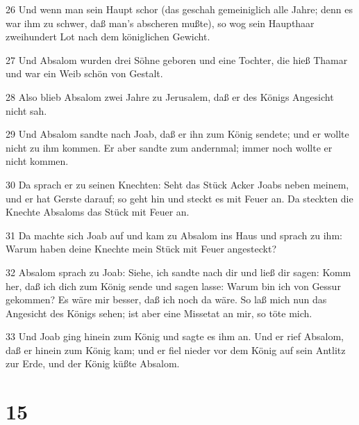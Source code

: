 \par 26 Und wenn man sein Haupt schor (das geschah gemeiniglich alle Jahre; denn es war ihm zu schwer, daß man's abscheren mußte), so wog sein Haupthaar zweihundert Lot nach dem königlichen Gewicht.
\par 27 Und Absalom wurden drei Söhne geboren und eine Tochter, die hieß Thamar und war ein Weib schön von Gestalt.
\par 28 Also blieb Absalom zwei Jahre zu Jerusalem, daß er des Königs Angesicht nicht sah.
\par 29 Und Absalom sandte nach Joab, daß er ihn zum König sendete; und er wollte nicht zu ihm kommen. Er aber sandte zum andernmal; immer noch wollte er nicht kommen.
\par 30 Da sprach er zu seinen Knechten: Seht das Stück Acker Joabs neben meinem, und er hat Gerste darauf; so geht hin und steckt es mit Feuer an. Da steckten die Knechte Absaloms das Stück mit Feuer an.
\par 31 Da machte sich Joab auf und kam zu Absalom ins Haus und sprach zu ihm: Warum haben deine Knechte mein Stück mit Feuer angesteckt?
\par 32 Absalom sprach zu Joab: Siehe, ich sandte nach dir und ließ dir sagen: Komm her, daß ich dich zum König sende und sagen lasse: Warum bin ich von Gessur gekommen? Es wäre mir besser, daß ich noch da wäre. So laß mich nun das Angesicht des Königs sehen; ist aber eine Missetat an mir, so töte mich.
\par 33 Und Joab ging hinein zum König und sagte es ihm an. Und er rief Absalom, daß er hinein zum König kam; und er fiel nieder vor dem König auf sein Antlitz zur Erde, und der König küßte Absalom.

\chapter{15}


